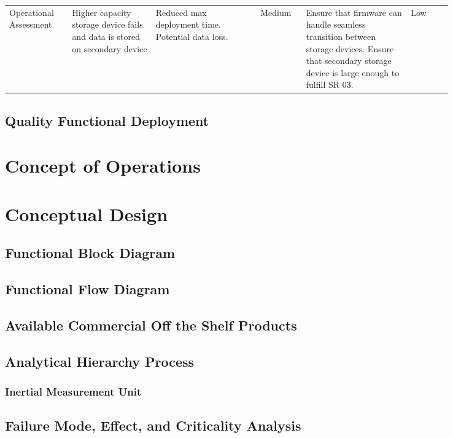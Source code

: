 \begin{landscape}
{\begin{longtable}{| p{0.12\linewidth} | p{0.16\linewidth} |  p{0.20\linewidth} | p{0.08\linewidth} | p{0.20\linewidth} | p{0.08\linewidth} |}
	\hline
	Operational \newline Assessment & Higher capacity storage device fails and data is stored on secondary device & Reduced max deployment time. \newline Potential data loss. & \cellcolor{yellow} Medium & Ensure that firmware can handle seamless transition between storage devices. \newline Ensure that secondary storage device is large enough to fulfill SR 03. & \cellcolor{green} Low
	\label{tab:sr11_feasibility}
\end{longtable}
}
\newpage

\end{landscape}

\subsection{Quality Functional Deployment} \label{ssec:qfd}

\section{Concept of Operations} \label{sec:conops}

\section{Conceptual Design} \label{sec:conceptual_design}

\subsection{Functional Block Diagram} \label{ssec:block_diagram}

\subsection{Functional Flow Diagram} \label{ssec:flow_diagram}

\subsection{Available Commercial Off the Shelf Products} \label{ssec:cots_products}

\subsection{Analytical Hierarchy Process} \label{ssec:ahp}

\subsubsection*{Inertial Measurement Unit} \label{sssec:ahp_imu}

\subsection{Failure Mode, Effect, and Criticality Analysis} \label{ssec:fmeca}